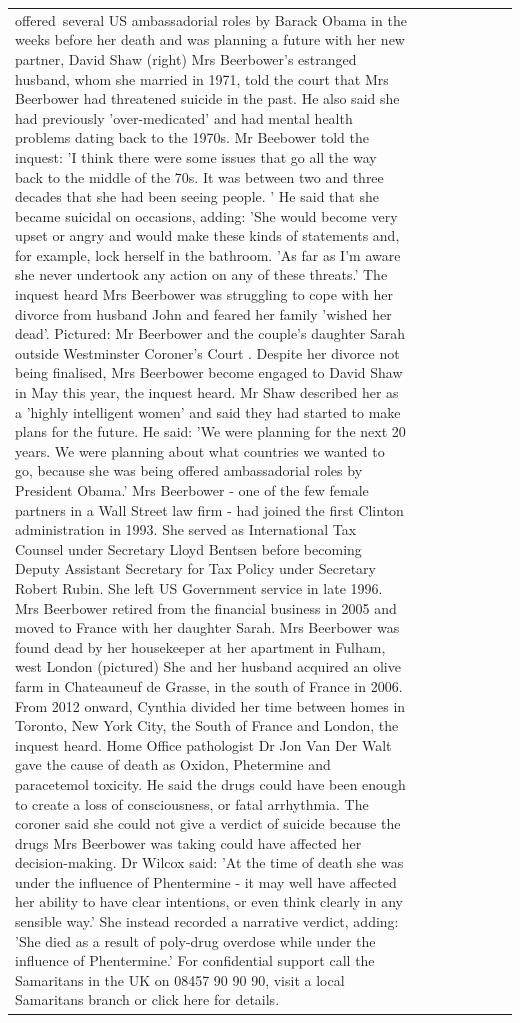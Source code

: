 \begin{table}[H]
\begin{tabular}{llrlllll}
offered several US ambassadorial roles by Barack Obama in the weeks before her death and was planning a future with her new partner, David Shaw (right) Mrs Beerbower's estranged husband, whom she married in 1971, told the court that Mrs Beerbower had threatened suicide in the past. He also said she had previously 'over-medicated' and had mental health problems dating back to the 1970s. Mr Beebower told the inquest: 'I think there were some issues that go all the way back to the middle of the 70s. It was between two and three decades that she had been seeing people. ' He said that she became suicidal on occasions, adding: 'She would become very upset or angry and would make these kinds of statements and, for example, lock herself in the bathroom. 'As far as I'm aware she never undertook any action on any of these threats.' The inquest heard Mrs Beerbower was struggling to cope with her divorce from husband John and feared her family 'wished her dead'. Pictured: Mr Beerbower and the couple's daughter Sarah outside Westminster Coroner's Court . Despite her divorce not being finalised, Mrs Beerbower become engaged to David Shaw in May this year, the inquest heard. Mr Shaw described her as a 'highly intelligent women' and said they had started to make plans for the future. He said: 'We were planning for the next 20 years. We were planning about what countries we wanted to go, because she was being offered ambassadorial roles by President Obama.' Mrs Beerbower - one of the few female partners in a Wall Street law firm - had joined the first Clinton administration in 1993. She served as International Tax Counsel under Secretary Lloyd Bentsen before becoming Deputy Assistant Secretary for Tax Policy under Secretary Robert Rubin. She left US Government service in late 1996. Mrs Beerbower retired from the financial business in 2005 and moved to France with her daughter Sarah. Mrs Beerbower was found dead by her housekeeper at her apartment in Fulham, west London (pictured) She and her husband acquired an olive farm in Chateauneuf de Grasse, in the south of France in 2006. From 2012 onward, Cynthia divided her time between homes in Toronto, New York City, the South of France and London, the inquest heard. Home Office pathologist Dr Jon Van Der Walt gave the cause of death as Oxidon, Phetermine and paracetemol toxicity. He said the drugs could have been enough to create a loss of consciousness, or fatal arrhythmia. The coroner said she could not give a verdict of suicide because the drugs Mrs Beerbower was taking could have affected her decision-making. Dr Wilcox said: 'At the time of death she was under the influence of Phentermine - it may well have affected her ability to have clear intentions, or even think clearly in any sensible way.' She instead recorded a narrative verdict, adding: 'She died as a result of poly-drug overdose while under the influence of Phentermine.' For confidential support call the Samaritans in the UK on 08457 90 90 90, visit a local Samaritans branch or click here for details.

\end{tabular}
\end{table}
